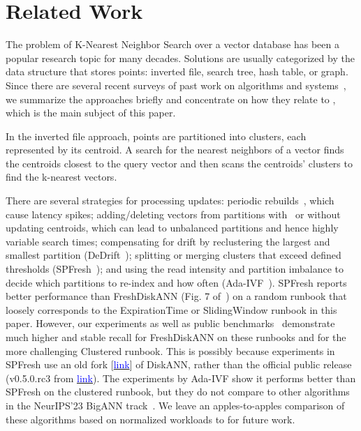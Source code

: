 \section{Related Work}
\label{sec:related}
The problem of K-Nearest Neighbor Search over a vector database
has been a popular research topic for many decades. 
Solutions are usually categorized by the data structure that stores points:
inverted file, search tree, hash table, or graph.
Since there are several recent surveys of past work on algorithms
and systems~\cite{AumullerCeccarello23, GraphANNSSurvey21, PanWL24, TAIPALUS2024101216, TianYZ0Z023},
we summarize the approaches briefly and concentrate on how they relate to \name,
which is the main subject of this paper.

In the inverted file approach, points are partitioned into 
clusters, each represented by its centroid.
A search for the nearest neighbors of a vector finds the centroids closest to the query vector and then scans the centroids' clusters to find the k-nearest vectors.

There are several strategies for processing updates: 
periodic rebuilds~\cite{AnalyticDBV}, which cause latency spikes; 
adding/deleting vectors from partitions with~\cite{ArandjelovicZ13} or without~\cite{pgvector} updating centroids, which can lead to unbalanced partitions and hence highly variable search times; 
compensating for drift by reclustering the largest and smallest partition (DeDrift~\cite{BaranchukDUY23});
splitting or merging clusters that exceed defined thresholds (SPFresh~\cite{YumingXuEtAl23});
and using the read intensity and partition imbalance to decide which partitions
to re-index and how often (Ada-IVF~\cite{MahoneyEtAl24}).
SPFresh  reports better performance than FreshDiskANN (Fig. 7 of~\cite{YumingXuEtAl23})
on a random runbook
that loosely corresponds to the ExpirationTime or SlidingWindow runbook
in this paper.
However, our experiments as well as  public benchmarks~\cite{bigann23}
demonstrate much higher and stable recall for FreshDiskANN on these runbooks
and for the more challenging Clustered runbook. 
This is possibly because experiments in SPFresh use an old fork [\href{https://github.com/Yuming-Xu/DiskANN_Baseline/commits/main/}{\textcolor{blue}{link}}] of DiskANN, 
rather than the official public release (v0.5.0.rc3
from \href{https://github.com/microsoft/DiskANN/tags}{\textcolor{blue}{link}}).
The experiments by Ada-IVF show it performs better than SPFresh on the clustered runbook,
but they do not compare to other algorithms in the NeurIPS'23 BigANN track~\cite{simhadri2024resultsbigannneurips23}. 
We leave an apples-to-apples comparison of these algorithms
based on normalized workloads to \name for future work.



